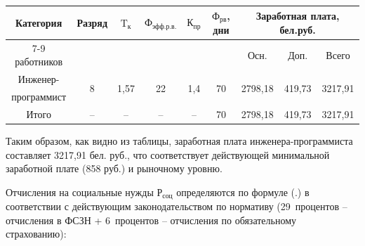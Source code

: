 {{\begin{Center}
            \renewcommand{\arraystretch}{1.4} %
            \begin{tabular}{|c|c|c|c|c|c|c|c|c|}
            \hline
            Категория    & \multirow{2}{*}{Разряд} & \multirow{2}{*}{$\textrm{T}_{\textrm{к}}$} & \multirow{2}{*}{$\textrm{Ф}_{\textrm{эфф.р.в.}}$} & \multirow{2}{*}{$\textrm{К}_{\textrm{пр}}$} & \multirow{2}{*}{$\textrm{Ф}_{\textrm{рв}}$, дни} & \multicolumn{3}{c|}{Заработная плата, бел.руб.} \\ \cline{7-9}
            работников   &                         &                                            &                                                   &                                             &                                                  & Осн. & Доп. & Всего \\ \hline
            Инженер-     & \multirow{2}{*}{8}      & \multirow{2}{*}{1,57}                      & \multirow{2}{*}{22}                               & \multirow{2}{*}{1,4}                        & \multirow{2}{*}{70}                              & \multirow{2}{*}{2798,18} & \multirow{2}{*}{419,73} & \multirow{2}{*}{3217,91} \\
            программист  &                         &                                            &                                                   &                                             &                                                  &      &      &          \\ \hline
            Итого        & {--}                    & {--}                                       & {--}                                              & {--}                                        & 70                                               & 2798,18 & 419,73 & 3217,91 \\ \hline
            \end{tabular}
        \end{Center}}
    \botTablespace \addtocounter{tablecntr}{1}

    \par \redline Таким образом, как видно из таблицы, заработная плата инженера-программиста составляет 3217,91 бел. руб., что соответствует действующей минимальной заработной плате (858 руб.) и рыночному уровню.

    \par \redline Отчисления на социальные нужды $\textrm{Р}_{\textrm{соц}}$ определяются по формуле (\thechaptercntr .\theformulacntr) в соответствии с действующим законодательством по нормативу (29~процентов {--} отчисления в ФСЗН + 6~процентов {--} отчисления по обязательному страхованию):

}
